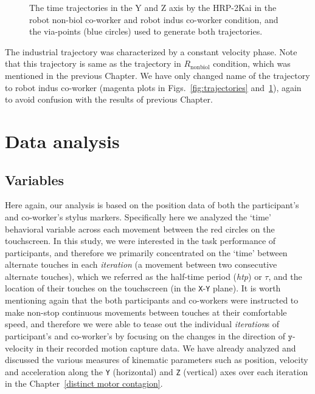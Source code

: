 \begin{figure}[hpt]
	\caption{The time trajectories in the Y and Z axis by the HRP-2Kai in the robot non-biol co-worker and robot indus co-worker condition, and the via-points (blue circles) used to generate both trajectories.}
	\label{fig:trajectories2}
\end{figure}


The industrial trajectory was characterized by a constant velocity phase. Note that this trajectory is same as the trajectory in $R_{\text{nonbiol}}$ condition, which was mentioned in the previous Chapter. We have only changed name of the trajectory to robot indus co-worker (magenta plots in Figs.~\ref{fig:trajectories} and~\ref{fig:trajectories2}), again to avoid confusion with the results of previous Chapter.
 

\section{Data analysis} \label{data_analysis}

\subsection{Variables}

Here again, our analysis is based on the position data of both the participant's and co-worker's stylus markers. Specifically here we analyzed the `time' behavioral variable across each movement between the red circles on the touchscreen. In this study, we were interested in the task performance of participants, and therefore we primarily concentrated on the `time' between alternate touches in each \textit{iteration} (a movement between two consecutive alternate touches), which we referred as the half-time period ({\it htp}) or $\tau$, and the location of their touches on the touchscreen (in the \texttt{X}-\texttt{Y} plane). It is worth mentioning again that the both participants and co-workers were instructed to make non-stop continuous movements between touches at their comfortable speed, and therefore we were able to tease out the individual \textit{iteration}s of participant's and co-worker's by focusing on the changes in the direction of $\texttt{y}$-velocity in their recorded motion capture data. We have already analyzed and discussed the various measures of kinematic parameters such as position, velocity and acceleration along the \texttt{Y} (horizontal) and \texttt{Z} (vertical) axes over each iteration in the Chapter~\ref{distinct motor contagion}.


